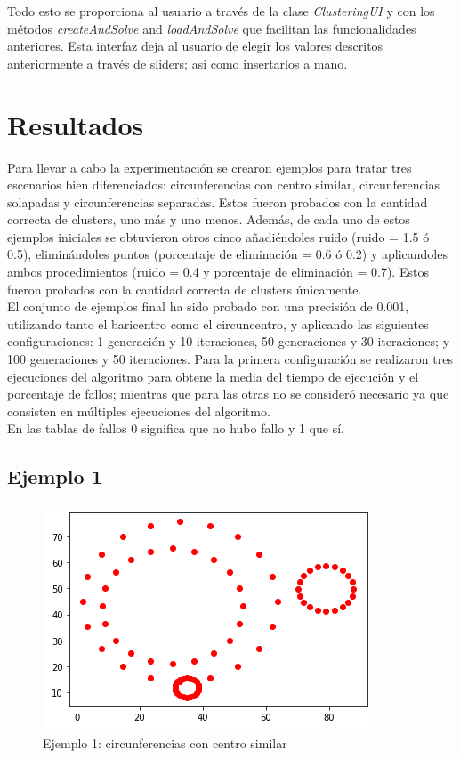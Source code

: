 \documentclass[conference,a4paper]{IEEEtran}
\begin{document}
Todo esto se proporciona al usuario a través de la clase \textit{ClusteringUI} y con los métodos \textit{createAndSolve} and \textit{loadAndSolve} que facilitan las funcionalidades anteriores. Esta interfaz deja al usuario de elegir los valores descritos anteriormente a través de sliders; así como insertarlos a mano.\\

\section{Resultados}

Para llevar a cabo la experimentación se crearon ejemplos para tratar tres escenarios bien diferenciados: circunferencias con centro similar, circunferencias solapadas y circunferencias separadas. Estos fueron probados con la cantidad correcta de clusters, uno más y uno menos. Además, de cada uno de estos ejemplos iniciales se obtuvieron otros cinco añadiéndoles ruido (ruido = 1.5 ó 0.5), eliminándoles puntos (porcentaje de eliminación = 0.6 ó 0.2) y aplicandoles ambos procedimientos (ruido = 0.4 y porcentaje de eliminación = 0.7). Estos fueron probados con la cantidad correcta de clusters únicamente.\\

El conjunto de ejemplos final ha sido probado con una precisión de 0.001, utilizando tanto el baricentro como el circuncentro, y aplicando las siguientes configuraciones: 1 generación y 10 iteraciones, 50 generaciones y 30 iteraciones; y 100 generaciones y 50 iteraciones. Para la primera configuración se realizaron tres ejecuciones del algoritmo para obtene la media del tiempo de ejecución y el porcentaje de fallos; mientras que para las otras no se consideró necesario ya que consisten en múltiples ejecuciones del algoritmo.\\

En las tablas de fallos 0 significa que no hubo fallo y 1 que sí.\\

\newpage
\subsection{Ejemplo 1}

\begin{figure}[H]
\centering
\includegraphics[scale=0.8]{Experimentacion/Ejemplo1/Ejemplo1}
\caption{Ejemplo 1: circunferencias con centro similar\\}
\end{figure}
\end{document}

